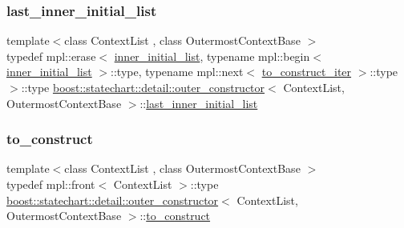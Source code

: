 \subsubsection{\texorpdfstring{last\+\_\+inner\+\_\+initial\+\_\+list}{last\_inner\_initial\_list}}
{\footnotesize\ttfamily template$<$class Context\+List , class Outermost\+Context\+Base $>$ \\
typedef mpl\+::erase$<$ \mbox{\hyperlink{structboost_1_1statechart_1_1detail_1_1outer__constructor_a4c1c7fd76b5d06da5ebc2dc2c99444f9}{inner\+\_\+initial\+\_\+list}}, typename mpl\+::begin$<$ \mbox{\hyperlink{structboost_1_1statechart_1_1detail_1_1outer__constructor_a4c1c7fd76b5d06da5ebc2dc2c99444f9}{inner\+\_\+initial\+\_\+list}} $>$\+::type, typename mpl\+::next$<$ \mbox{\hyperlink{structboost_1_1statechart_1_1detail_1_1outer__constructor_a90925740f3c0336f09a152967a7e7173}{to\+\_\+construct\+\_\+iter}} $>$\+::type $>$\+::type \mbox{\hyperlink{structboost_1_1statechart_1_1detail_1_1outer__constructor}{boost\+::statechart\+::detail\+::outer\+\_\+constructor}}$<$ Context\+List, Outermost\+Context\+Base $>$\+::\mbox{\hyperlink{structboost_1_1statechart_1_1detail_1_1outer__constructor_aef3673c2c30adab76dab9a8431f476e4}{last\+\_\+inner\+\_\+initial\+\_\+list}}}

\mbox{\label{structboost_1_1statechart_1_1detail_1_1outer__constructor_a9ebebe2d638d5f65279cc24fab763952}} 
\subsubsection{\texorpdfstring{to\+\_\+construct}{to\_construct}}
{\footnotesize\ttfamily template$<$class Context\+List , class Outermost\+Context\+Base $>$ \\
typedef mpl\+::front$<$ Context\+List $>$\+::type \mbox{\hyperlink{structboost_1_1statechart_1_1detail_1_1outer__constructor}{boost\+::statechart\+::detail\+::outer\+\_\+constructor}}$<$ Context\+List, Outermost\+Context\+Base $>$\+::\mbox{\hyperlink{structboost_1_1statechart_1_1detail_1_1outer__constructor_a9ebebe2d638d5f65279cc24fab763952}{to\+\_\+construct}}}

